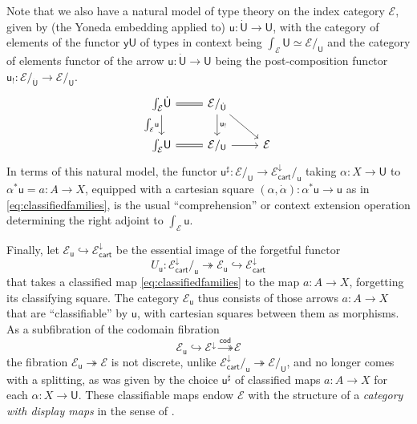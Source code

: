 \documentclass[12pt,reqno]{amsart}
\newcommand{\EE}{\ensuremath{\mathcal{E}}}
\newcommand{\y}{\ensuremath{\mathsf{y}}} %
\newcommand{\hook}{\ensuremath{\hookrightarrow}}
\renewcommand{\epi}{\ensuremath{\twoheadrightarrow}}
\renewcommand{\to}{\ensuremath{\rightarrow}}
\renewcommand{\u}{\ensuremath{\mathsf{u}}}
\renewcommand{\t}{\ensuremath{\mathsf{u}}}
\newcommand{\T}{\ensuremath{\mathsf{U}}}
\newcommand{\TT}{\ensuremath{\dot{\mathsf{U}}}}
\theoremstyle{remark}
\theoremstyle{definition}
\begin{document}
Note that we also have a natural model of type theory on the index category $\EE$, given by (the Yoneda embedding applied to) $\t: \TT \to \T$, with the category of elements of the functor $\y\T$ of types in context being $\int_{\EE}\!\T \simeq \EE/_\T$ and the category of elements functor of the arrow $\t: \TT \to \T$ being the post-composition functor $\t_{!} : \EE/_{\TT} \to \EE/_{\T}$.
 \begin{equation}\label{eq:sliceadjunctionelements}
\begin{tikzcd}
\int_{\EE}\!\TT \ar[d,swap, "{\int_{\EE}\!\t}"] \ar[r, equals] & \EE/_{\TT} \ar[d, "{\t_{!}}"] \ar[rd] & \\
 \int_{\EE}\!\T \ar[r,equals] &  \EE/_\T \ar[r] & \EE
 \end{tikzcd}
 \end{equation}
 In terms of this natural model, the functor $\t^{\sharp} : \EE/_\T \to \EE^{\downarrow}_{\mathsf{cart}}/_{\t}$ taking $\alpha : X \to \T$ to $\alpha^*\t = a: A \to X$, equipped with a cartesian square $(\alpha, \dot{\alpha}) : \alpha^*\t \to \t$ as in \eqref{eq:classifiedfamilies}, is the usual ``comprehension'' or context extension operation determining the right adjoint to $\int_{\EE}\!\t$.
 
Finally, let $\EE_\t \hook  \EE^{\downarrow}_{\mathsf{cart}}$ be the essential image of the forgetful functor 
\[
U_\t :  \EE^{\downarrow}_{\mathsf{cart}}/_{\t} \twoheadrightarrow \EE_\t \hook \EE^{\downarrow}_{\mathsf{cart}}
\]
that takes a classified map \eqref{eq:classifiedfamilies} to the map $a : A \to X$, forgetting its classifying square.  
The category $\EE_\t$ thus consists of those arrows $a:A \to X$ that are ``classifiable'' by $\t$, with cartesian squares between them as morphisms. As a subfibration of the codomain fibration 
\[
\EE_\t \hook \EE^\downarrow \stackrel{\mathsf{cod}}{\epi} \EE
\]
 the fibration $\EE_\t \epi \EE$ is not discrete, unlike $\EE^{\downarrow}_{\mathsf{cart}}/_{\t} \twoheadrightarrow \EE/_\T$, and %
no longer comes with a splitting, as was given by the choice $\u^\sharp$ of classified maps $a : A\to X$ for each $\alpha : X \to \T$.  These classifiable maps endow $\EE$ with the structure of a \emph{category with display maps} in the sense of \cite{Taylor:PFM}.  
\end{document}

